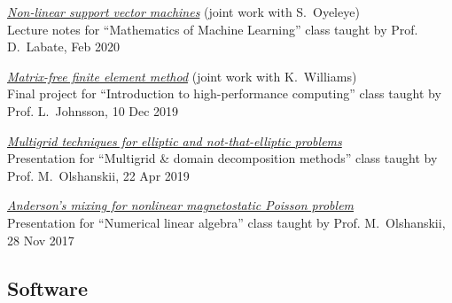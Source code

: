 \documentclass[a4paper,12pt]{article}
\begin{document}
	\begin{etaremune}[topsep=0pt]
		\item \textit{\href{https://www.math.uh.edu/~dlabate/LectureNote_03.pdf}{Non-linear support vector machines}} (joint work with S.~Oyeleye)\\
		      Lecture notes for ``Mathematics of Machine Learning'' class taught by Prof. D.~Labate, Feb 2020 
		\item \textit{\href{https://www.researchgate.net/publication/338009857_Matrix-free_finite_element_method}{Matrix-free finite element method}} (joint work with K.~Williams)\\ 
		      Final project for ``Introduction to high-performance computing'' class taught by Prof. L.~Johnsson, 10 Dec 2019
		\item \textit{\href{https://www.researchgate.net/publication/338011181_Multigrid_techniques_for_elliptic_and_not-that-elliptic_problems}{Multigrid techniques for elliptic and not-that-elliptic problems}}\\ 
		      Presentation for ``Multigrid \& domain decomposition methods'' class taught by Prof. M.~Olshanskii, 22 Apr 2019
		\item \textit{\href{https://www.researchgate.net/publication/321334354_Anderson's_mixing_for_nonlinear_magnetostatic_Poisson_problem}{Anderson's mixing for nonlinear magnetostatic Poisson problem}}\\ 
		      Presentation for ``Numerical linear algebra'' class taught by Prof. M.~Olshanskii, 28 Nov 2017
	\end{etaremune}

	\subsection*{Software}
	
\end{document}
